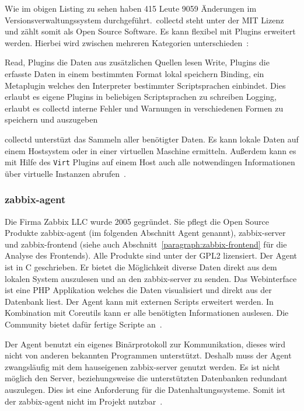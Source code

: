 

Wie im obigen Listing zu sehen haben 415 Leute 9059 Änderungen im
Versionsverwaltungssystem durchgeführt.\ collectd steht unter der MIT Lizenz
und zählt somit als Open Source Software. Es kann flexibel mit Plugins
erweitert werden. Hierbei wird zwischen mehreren Kategorien
unterschieden~\cite{collectd_plugins}:

\begin{outline}
  \1 Read, Plugins die Daten aus zusätzlichen Quellen lesen
  \1 Write, Plugins die erfasste Daten in einem bestimmten Format lokal
  speichern
  \1 Binding, ein Metaplugin welches den Interpreter bestimmter Scriptsprachen
  einbindet. Dies erlaubt es eigene Plugins in beliebigen Scriptsprachen zu
  schreiben
  \1 Logging, erlaubt es collectd interne Fehler und Warnungen in verschiedenen
  Formen zu speichern und auszugeben
\end{outline}

collectd unterstüzt das Sammeln aller benötigter Daten. Es kann lokale Daten
auf einem Hostsystem oder in einer virtuellen Maschine ermitteln. Außerdem kann
es mit Hilfe des \texttt{Virt} Plugins auf einem Host auch alle notwendingen
Informationen über virtuelle Instanzen abrufen~\cite{collectd_virt_plugins}.
\tm%

\subsubsection{zabbix-agent}
Die Firma Zabbix LLC wurde 2005 gegründet. Sie pflegt die Open Source
Produkte zabbix-agent (im folgenden Abschnitt Agent genannt), zabbix-server und
zabbix-frontend (siehe auch Abschnitt~\ref{paragraph:zabbix-frontend} für die
Analyse des Frontends). Alle Produkte sind unter der GPL2 lizensiert. Der Agent
ist in C geschrieben. Er bietet die Möglichkeit diverse Daten direkt aus dem
lokalen System auszulesen und an den zabbix-server zu senden. Das Webinterface
ist eine PHP Applikation welches die Daten visualisiert und direkt aus der
Datenbank liest. Der Agent kann mit externen Scripts erweitert werden. In
Kombination mit Coreutils kann er alle benötigten Informationen auslesen. Die
Community bietet dafür fertige Scripte an~\cite{zabbix_virt_plugins}.

Der Agent benutzt ein eigenes Binärprotokoll zur Kommunikation, dieses wird
nicht von anderen bekannten Programmen unterstützt. Deshalb muss der Agent
zwangsläufig mit dem hauseigenen zabbix-server genutzt werden. Es ist nicht
möglich den Server, beziehungsweise die unterstützten Datenbanken redundant
auszulegen. Dies ist eine Anforderung für die Datenhaltungssysteme. Somit
ist der zabbix-agent nicht im Projekt nutzbar~\cite{zabbix_architecture}.
\tm%

